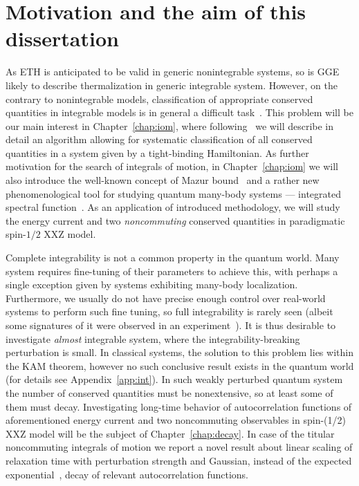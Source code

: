 \section{Motivation and the aim of this dissertation}
As ETH is anticipated to be valid in generic
nonintegrable systems, so is GGE likely to describe thermalization in generic integrable system.
However, on the contrary to nonintegrable models, classification of appropriate 
conserved quantities in integrable models is in general a difficult task~\autocite{DAlessio2016}.
This problem will be our main interest in Chapter~\ref{chap:iom}, where 
following~\textcite{Mierzejewski2015a} we will describe in detail an algorithm allowing for
systematic classification of all conserved quantities in a system given by a tight-binding
Hamiltonian. As further motivation for the search of integrals of motion, in
Chapter~\ref{chap:iom} we will also introduce the well-known concept of Mazur 
bound~\autocite{Mazur1969,Suzuki1971} and a rather new phenomenological tool for studying
quantum many-body systems --- integrated spectral function~\autocite{Vidmar2021}. 
As an application of introduced methodology, we will study the energy current and
two \textit{noncommuting} conserved quantities in paradigmatic spin-\(1/2\) XXZ model.


Complete integrability is not a common property in the quantum world.
Many system requires fine-tuning of their parameters to achieve this, with perhaps a single
exception given by systems exhibiting many-body localization. Furthermore, we usually
do not have precise enough control over real-world systems to perform such fine tuning,
so full integrability is rarely seen (albeit some signatures of it were 
observed in an experiment~\autocite{Khemani2019}). It is thus desirable to investigate
\emph{almost} integrable system, where the integrability-breaking perturbation is small.
In classical systems, the solution to this problem lies within the KAM theorem, however
no such conclusive result exists in the quantum world (for details see Appendix~\ref{app:int}).
In such weakly perturbed quantum system the number of conserved quantities must be nonextensive,
so at least some of them must decay. Investigating long-time behavior of autocorrelation functions of
aforementioned energy current and two noncommuting observables 
in spin-(1/2) XXZ model will be the subject of Chapter~\ref{chap:decay}. In case of
the titular noncommuting integrals of motion we report a novel
result about linear scaling of relaxation time with perturbation strength and Gaussian,
instead of the expected exponential~\autocite{mallayya2019}, decay of relevant autocorrelation functions.
 
